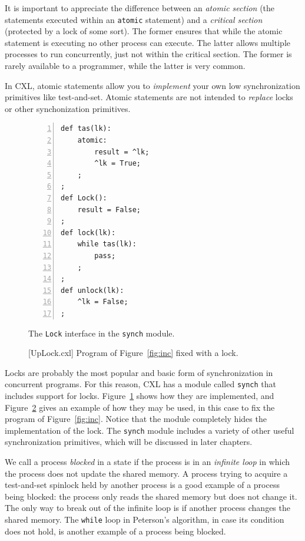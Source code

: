 \documentclass{report}
\newenvironment{code}{
\tcolorbox
}{
\endtcolorbox
}
\begin{document}
It is important to appreciate the difference between an
\emph{atomic section} (the statements executed within an
\texttt{atomic} statement) and a \emph{critical section}
(protected by a lock of some sort).
The former ensures that while the
atomic statement is executing no other process can execute.
The latter allows multiple processes to run concurrently,
just not within the critical section.
The former is rarely available to a programmer, while the latter
is very common.

In CXL, atomic statements allow you to \emph{implement} your own
low synchronization primitives like test-and-set.  Atomic statements
are not intended to \emph{replace} locks or other synchonization primitives.

\begin{figure}
\begin{code}
\begin{Verbatim}[xleftmargin=5mm,numbers=left]
def tas(lk):
    atomic:
        result = ^lk;
        ^lk = True;
    ;
;
def Lock():
    result = False;
;
def lock(lk):
    while tas(lk):
        pass;
    ;
;
def unlock(lk):
    ^lk = False;
;
\end{Verbatim}
\end{code}
\caption{The \texttt{Lock} interface in the \texttt{synch} module.}
\label{fig:spinlocks}
\end{figure}

\begin{figure}
\begin{code}
\end{code}
\caption{[UpLock.cxl] Program of Figure~\ref{fig:inc} fixed with a lock.}
\label{fig:incfixed}
\end{figure}

Locks are probably the most popular and basic form of synchronization
in concurrent programs.  For this reason, CXL has a module called
\texttt{synch} that includes support for locks.
Figure~\ref{fig:spinlocks} shows how they are implemented, and
Figure~\ref{fig:incfixed} gives an example of how they may be used,
in this case to fix the program of Figure~\ref{fig:inc}.
Notice that the module completely hides the implementation of the
lock.
The \texttt{synch} module includes a variety of other useful
synchronization primitives, which will be discussed in later
chapters.

We call a process \emph{blocked} in a state if the process is in
an \emph{infinite loop} in which the process does not update the
shared memory.
A process trying to
acquire a test-and-set spinlock held by another process is a good example
of a process being blocked: the process only reads the shared memory
but does not change it.
The only way to break out of the infinite loop is if another process
changes the shared memory.
The \texttt{while} loop in Peterson's algorithm, in case its condition
does not hold, is another example of a process being blocked.
\end{document}
